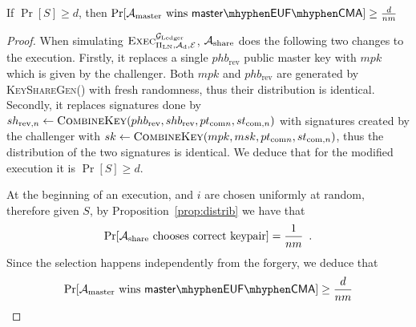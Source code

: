   \begin{proposition}
  \label{prop:forgery:master}
    If $\Pr[S] \geq d$, then $\Pr[\adversary_{\mathrm{master}} \text{ wins }
    \mathsf{master \mhyphen EUF \mhyphen CMA}] \geq \frac{d}{nm}$
  \end{proposition}

  \begin{proof}
    When simulating $\textsc{Exec}^{\mathcal{G}_{\mathrm{Ledger}}}_{\Pi_{\mathrm{LN}},
    \mathcal{A}_{\mathrm{d}}, \mathcal{E}}$, $\mathcal{A}_{\mathrm{share}}$ does
    the following two changes to the execution. Firstly, it replaces a single
    $phb_{\mathrm{rev}}$ public master key with $mpk$ which is given by the
    challenger. Both $mpk$ and $phb_{\mathrm{rev}}$ are generated by
    \textsc{KeyShareGen}() with fresh randomness, thus their distribution is
    identical. Secondly, it replaces signatures done by $sh_{\mathrm{rev}, n}
    \gets \textsc{CombineKey}(phb_{\mathrm{rev}}, shb_{\mathrm{rev}},
    pt_{\mathrm{com} n}, st_{\mathrm{com}, n})$ with signatures created by the
    challenger with $sk \gets \textsc{CombineKey}(mpk, msk, pt_{\mathrm{com} n},
    st_{\mathrm{com}, n})$, thus the distribution of the two signatures is
    identical. We deduce that for the modified execution it is $\Pr[S] \geq d$.

    At the beginning of an execution, \alice and $i$ are chosen uniformly
    at random, therefore given $S$, by Proposition~\ref{prop:distrib} we have
    that
    \begin{equation*}
      \Pr[\mathcal{A}_{\mathrm{share}} \text{ chooses correct keypair}] =
      \frac{1}{nm} \enspace.
    \end{equation*}
    Since the selection happens independently from the forgery, we deduce that
    \begin{equation*}
      \Pr[\adversary_{\mathrm{master}} \text{ wins } \mathsf{master \mhyphen EUF
      \mhyphen CMA}] \geq \frac{d}{nm}
    \end{equation*}
  \end{proof}
